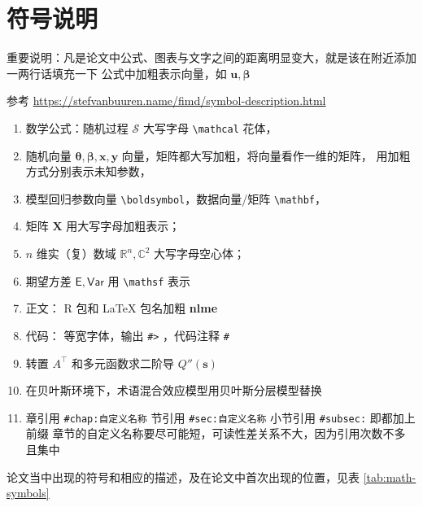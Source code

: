 \documentclass[12pt,a4paper,UTF8,twoside]{book}
\providecommand{\tightlist}{%
  \setlength{\itemsep}{0pt}\setlength{\parskip}{0pt}}
\theoremstyle{definition}
\theoremstyle{definition}
\theoremstyle{definition}
\theoremstyle{remark}
\begin{document}
\hypertarget{Conventions-Colophon}{%
\section{符号说明}\label{Conventions-Colophon}}

重要说明：凡是论文中公式、图表与文字之间的距离明显变大，就是该在附近添加一两行话填充一下
公式中加粗表示向量，如 \(\mathbf{u},\boldsymbol{\beta}\)

参考 \url{https://stefvanbuuren.name/fimd/symbol-description.html}

\begin{enumerate}
\def\labelenumi{\arabic{enumi}.}
\tightlist
\item
  数学公式：随机过程 \(\mathcal{S}\) 大写字母
  \texttt{\textbackslash{}mathcal} 花体，
\item
  随机向量 \(\boldsymbol{\theta,\beta},\mathbf{x,y}\)
  向量，矩阵都大写加粗，将向量看作一维的矩阵，
  用加粗方式分别表示未知参数，
\item
  模型回归参数向量 \texttt{\textbackslash{}boldsymbol}，数据向量/矩阵
  \texttt{\textbackslash{}mathbf}，
\item
  矩阵 \(\mathbf{X}\) 用大写字母加粗表示；
\item
  \(n\) 维实（复）数域 \(\mathbb{R}^n, \mathbb{C}^2\) 大写字母空心体；
\item
  期望方差 \(\mathsf{E,Var}\) 用 \texttt{\textbackslash{}mathsf} 表示
\item
  正文： R 包和 LaTeX 包名加粗 \textbf{nlme}
\item
  代码： 等宽字体，输出 \texttt{\#\textgreater{}} ，代码注释 \texttt{\#}
\item
  转置 \(A^{\top}\) 和多元函数求二阶导 \(Q''(\mathbf{s})\)
\item
  在贝叶斯环境下，术语混合效应模型用贝叶斯分层模型替换
\item
  章引用 \texttt{\#chap:自定义名称} 节引用 \texttt{\#sec:自定义名称}
  小节引用 \texttt{\#subsec:} 即都加上前缀
  章节的自定义名称要尽可能短，可读性差关系不大，因为引用次数不多且集中
\end{enumerate}

论文当中出现的符号和相应的描述，及在论文中首次出现的位置，见表
\ref{tab:math-symbols}
\end{document}
